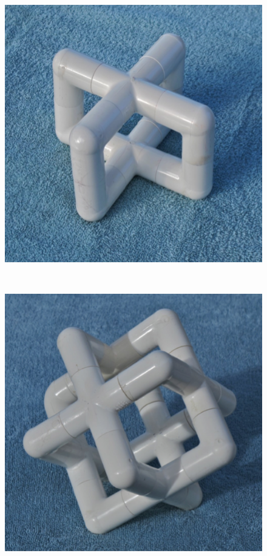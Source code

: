 \documentclass[letterpaper,11pt]{article}
\begin{document}
\begin{figure}[h!tbp]
\begin{minipage}[b]{0.2\textwidth}
        	\subcaption{} %
        	\label{fig:2b}
\end{minipage}
~ %
\begin{minipage}[b]{0.2\textwidth} 
	\includegraphics[width=\textwidth]{figures/figure2c.png}
        	\subcaption{} %
        	\label{fig:2c}
\end{minipage}
~ %
\begin{minipage}[b]{0.2\textwidth} 
	\includegraphics[width=\textwidth]{figures/figure2d.png}

\end{minipage}
\end{figure}
\end{document}
